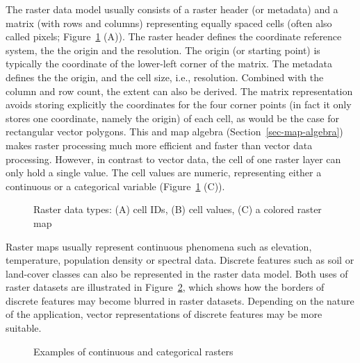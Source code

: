 \documentclass[
  letterpaper,
]{krantz}
\begin{document}
The raster data model usually consists of a raster header (or metadata)
and a matrix (with rows and columns) representing equally spaced cells
(often also called pixels; Figure~\ref{fig-raster-intro-plot1} (A)). The
raster header defines the coordinate reference system, the the origin
and the resolution. The origin (or starting point) is typically the
coordinate of the lower-left corner of the matrix. The metadata defines
the the origin, and the cell size, i.e., resolution. Combined with the
column and row count, the extent can also be derived. The matrix
representation avoids storing explicitly the coordinates for the four
corner points (in fact it only stores one coordinate, namely the origin)
of each cell, as would be the case for rectangular vector polygons. This
and map algebra (Section~\ref{sec-map-algebra}) makes raster processing
much more efficient and faster than vector data processing. However, in
contrast to vector data, the cell of one raster layer can only hold a
single value. The cell values are numeric, representing either a
continuous or a categorical variable
(Figure~\ref{fig-raster-intro-plot1} (C)).

\begin{figure}


\caption{\label{fig-raster-intro-plot1}Raster data types: (A) cell IDs,
(B) cell values, (C) a colored raster map}

\end{figure}%

Raster maps usually represent continuous phenomena such as elevation,
temperature, population density or spectral data. Discrete features such
as soil or land-cover classes can also be represented in the raster data
model. Both uses of raster datasets are illustrated in
Figure~\ref{fig-raster-intro-plot2}, which shows how the borders of
discrete features may become blurred in raster datasets. Depending on
the nature of the application, vector representations of discrete
features may be more suitable.

\begin{figure}


\caption{\label{fig-raster-intro-plot2}Examples of continuous and
categorical rasters}

\end{figure}%
\end{document}
